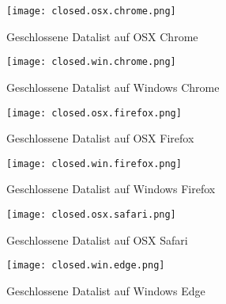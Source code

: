

\begin{figure}[!htb]
    \centering
    \begin{minipage}[b]{0.45\textwidth}
        \centering
        \texttt{[image: closed.osx.chrome.png]}
        \caption{Geschlossene Datalist auf OSX Chrome}
        \label{img:closedOsxChromeDatalist}
    \end{minipage}
    \hfill
    \begin{minipage}[b]{0.45\textwidth}
        \centering
        \texttt{[image: closed.win.chrome.png]}
        \caption{Geschlossene Datalist auf Windows Chrome}
        \label{img:closedWinChromeDatalist}
    \end{minipage}
\end{figure}

\begin{figure}[!htb]
    \centering
    \begin{minipage}[b]{0.45\textwidth}
        \centering
        \texttt{[image: closed.osx.firefox.png]}
        \caption{Geschlossene Datalist auf OSX Firefox}
        \label{img:closedOsxFirefoxDatalist}
    \end{minipage}
    \hfill
    \begin{minipage}[b]{0.45\textwidth}
        \centering
        \texttt{[image: closed.win.firefox.png]}
        \caption{Geschlossene Datalist auf Windows Firefox}
        \label{img:closedWinFirefoxDatalist}
    \end{minipage}
\end{figure}

\begin{figure}[!htb]
    \centering
    \begin{minipage}[b]{0.45\textwidth}
        \centering
        \texttt{[image: closed.osx.safari.png]}
        \caption{Geschlossene Datalist auf OSX Safari}
        \label{img:closedOsxSafariDatalist}
    \end{minipage}
    \hfill
    \begin{minipage}[b]{0.45\textwidth}
        \centering
        \texttt{[image: closed.win.edge.png]}
        \caption{Geschlossene Datalist auf Windows Edge}
        \label{img:closedWinEdgeDatalist}
    \end{minipage}
\end{figure}



